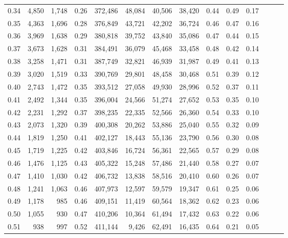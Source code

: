 \begin{tabular}{rrrrrrrrrrrrrr}
0.34 &   4,850 &  1,748 &  0.26 &  372,486 &   48,084 &  40,506 &  38,420 &  0.44 &  0.49 &      0.17 \\
0.35 &   4,363 &  1,696 &  0.28 &  376,849 &   43,721 &  42,202 &  36,724 &  0.46 &  0.47 &      0.16 \\
0.36 &   3,969 &  1,638 &  0.29 &  380,818 &   39,752 &  43,840 &  35,086 &  0.47 &  0.44 &      0.15 \\
0.37 &   3,673 &  1,628 &  0.31 &  384,491 &   36,079 &  45,468 &  33,458 &  0.48 &  0.42 &      0.14 \\
0.38 &   3,258 &  1,471 &  0.31 &  387,749 &   32,821 &  46,939 &  31,987 &  0.49 &  0.41 &      0.13 \\
0.39 &   3,020 &  1,519 &  0.33 &  390,769 &   29,801 &  48,458 &  30,468 &  0.51 &  0.39 &      0.12 \\
0.40 &   2,743 &  1,472 &  0.35 &  393,512 &   27,058 &  49,930 &  28,996 &  0.52 &  0.37 &      0.11 \\
0.41 &   2,492 &  1,344 &  0.35 &  396,004 &   24,566 &  51,274 &  27,652 &  0.53 &  0.35 &      0.10 \\
0.42 &   2,231 &  1,292 &  0.37 &  398,235 &   22,335 &  52,566 &  26,360 &  0.54 &  0.33 &      0.10 \\
0.43 &   2,073 &  1,320 &  0.39 &  400,308 &   20,262 &  53,886 &  25,040 &  0.55 &  0.32 &      0.09 \\
0.44 &   1,819 &  1,250 &  0.41 &  402,127 &   18,443 &  55,136 &  23,790 &  0.56 &  0.30 &      0.08 \\
0.45 &   1,719 &  1,225 &  0.42 &  403,846 &   16,724 &  56,361 &  22,565 &  0.57 &  0.29 &      0.08 \\
0.46 &   1,476 &  1,125 &  0.43 &  405,322 &   15,248 &  57,486 &  21,440 &  0.58 &  0.27 &      0.07 \\
0.47 &   1,410 &  1,030 &  0.42 &  406,732 &   13,838 &  58,516 &  20,410 &  0.60 &  0.26 &      0.07 \\
0.48 &   1,241 &  1,063 &  0.46 &  407,973 &   12,597 &  59,579 &  19,347 &  0.61 &  0.25 &      0.06 \\
0.49 &   1,178 &    985 &  0.46 &  409,151 &   11,419 &  60,564 &  18,362 &  0.62 &  0.23 &      0.06 \\
0.50 &   1,055 &    930 &  0.47 &  410,206 &   10,364 &  61,494 &  17,432 &  0.63 &  0.22 &      0.06 \\
0.51 &     938 &    997 &  0.52 &  411,144 &    9,426 &  62,491 &  16,435 &  0.64 &  0.21 &      0.05 \\

\end{tabular}
